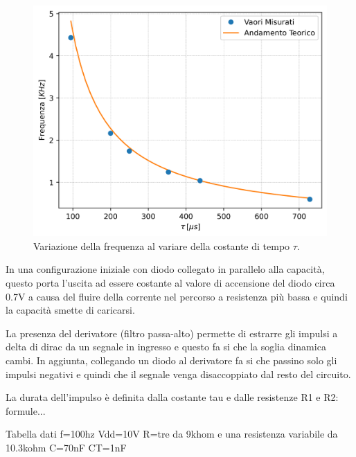 \documentclass[a4paper,12pt]{article}
\begin{document}
\begin{figure}[h]
    \centering
    \includegraphics[width=0.6\linewidth]{immagini/ocillatore/freq_tau.png}
    \caption{Variazione della frequenza al variare della costante di tempo $\tau$.}
\end{figure}

In una configurazione iniziale con diodo collegato in parallelo alla capacità, questo porta l'uscita ad essere costante al valore di accensione del diodo circa 0.7V a causa del fluire della corrente nel percorso a resistenza più bassa e quindi la capacità smette di caricarsi.

La presenza del derivatore (filtro passa-alto) permette di estrarre gli impulsi a delta di dirac da un segnale in ingresso e questo fa si che la soglia dinamica cambi.
In aggiunta, collegando un diodo al derivatore fa si che passino solo gli impulsi negativi e quindi che il segnale venga disaccoppiato dal resto del circuito.

La durata dell'impulso è definita dalla costante tau e dalle resistenze R1 e R2:
formule...

Tabella dati 
f=100hz
Vdd=10V
R=tre da 9khom e una resistenza variabile da 10.3kohm
C=70nF
CT=1nF
\end{document}
